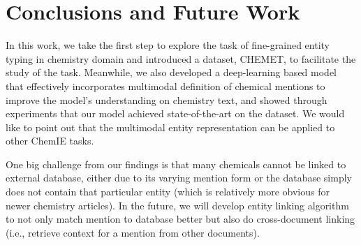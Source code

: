 

\section{Conclusions and Future Work}


In this work, we take the first step to  explore the task of fine-grained entity typing in chemistry domain and introduced a dataset, CHEMET, to facilitate the study of the task. Meanwhile, we also developed a  deep-learning based model that effectively incorporates multimodal definition of chemical mentions to improve the model's understanding on chemistry text, and showed through experiments that our model achieved state-of-the-art on the dataset. We would like to point out that the multimodal entity representation can be applied to other ChemIE tasks.

One big challenge from our findings is that many chemicals cannot be linked to external database, either due to its varying mention form or the database simply does not contain that particular entity (which is relatively more obvious for newer chemistry articles). In the future, we will develop entity linking algorithm to not only match mention to database better but also do cross-document linking (i.e., retrieve context for a mention from other documents).